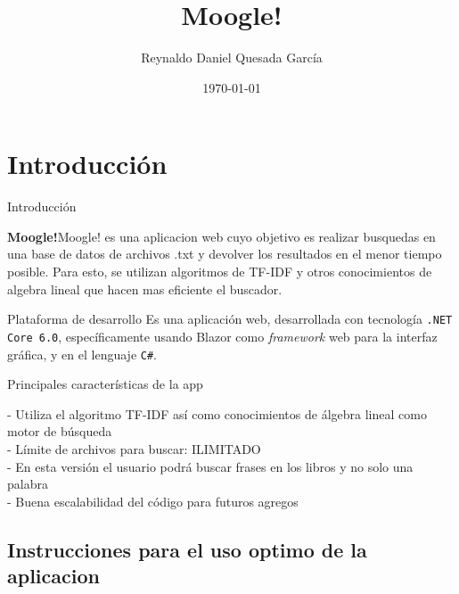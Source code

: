 \documentclass{beamer}
\title[Moogle!]{\LARGE Moogle!}
\author{Reynaldo Daniel Quesada García}
\institute[Universidad de La Habana]
{
  Matcom
}
\date{\today}
\begin{document}
\begin{frame}
  \maketitle
\end{frame}

\section{Introducción}

\begin{frame}{Introducción}
  
  \textbf{Moogle!}Moogle! es una aplicacion web cuyo objetivo es realizar busquedas en una base
de datos de archivos .txt y devolver los resultados en el menor tiempo posible.
Para esto, se utilizan algoritmos de TF-IDF y otros conocimientos de algebra
lineal que hacen mas eficiente el buscador.


\end{frame}

\begin{frame}{Plataforma de desarrollo}
  Es una aplicación web, desarrollada con tecnología {\tt .NET Core 6.0}, específicamente
  usando Blazor como {\it framework} web para la interfaz gráfica, y en el
  lenguaje {\tt C\#}. \\
\end{frame}

\begin{frame}{Principales características de la app}
    
	- Utiliza el algoritmo TF-IDF así como conocimientos de álgebra lineal como motor de búsqueda
	\\- Límite de archivos para buscar: ILIMITADO
	\\- En esta versión el usuario podrá buscar frases en los libros y no solo una palabra
	\\- Buena escalabilidad del código para futuros agregos 
    
\end{frame}

\subsection*{Instrucciones para el uso optimo de la aplicacion}
\end{document}
